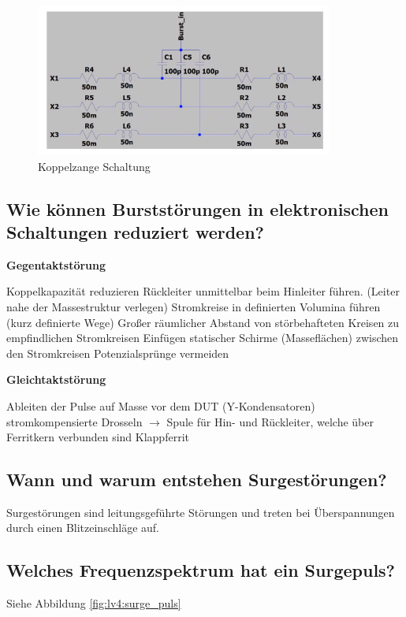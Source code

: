 \begin{figure}[ht]
  \centering
  \includegraphics[height=5cm]{src/assets/pictures/lv4_koppelzange.png}
  \caption{Koppelzange Schaltung}\label{fig:lv4:koppelzange}
\end{figure}

\subsection{Wie können Burststörungen in elektronischen Schaltungen reduziert werden?}
\textbf{Gegentaktstörung}
\begin{outline}
  \1 Koppelkapazität reduzieren
  \1 Rückleiter unmittelbar beim Hinleiter führen. (Leiter nahe der Massestruktur verlegen)
  \1 Stromkreise in definierten Volumina führen (kurz definierte Wege)
  \1 Großer räumlicher Abstand von störbehafteten Kreisen zu empfindlichen Stromkreisen
  \1 Einfügen statischer Schirme (Masseflächen) zwischen den Stromkreisen
  \1 Potenzialsprünge vermeiden
\end{outline}
%
\textbf{Gleichtaktstörung}
\begin{outline}
  \1 Ableiten der Pulse auf Masse vor dem DUT (Y-Kondensatoren)
  \1 stromkompensierte Drosseln \(\rightarrow\) Spule für Hin- und Rückleiter, welche über Ferritkern verbunden sind
  \1 Klappferrit
\end{outline}

\subsection{Wann und warum entstehen Surgestörungen?}
Surgestörungen sind leitungsgeführte Störungen und treten bei Überspannungen durch einen Blitzeinschläge auf.

\subsection{Welches Frequenzspektrum hat ein Surgepuls?}
Siehe Abbildung \ref{fig:lv4:surge_puls}

